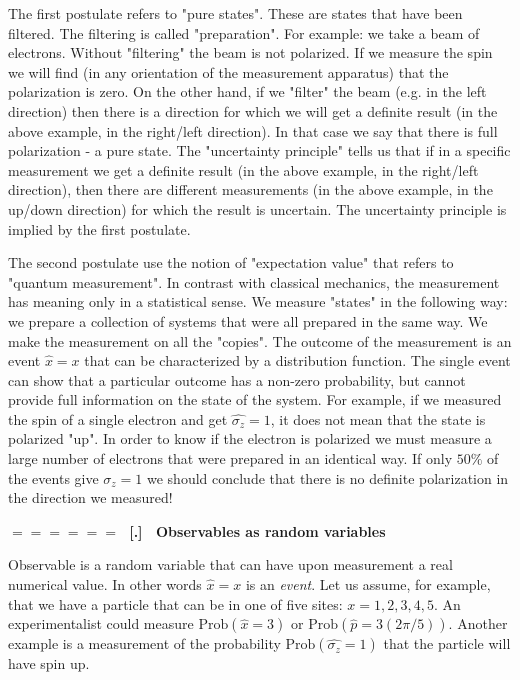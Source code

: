 \documentclass[onecolumn,fleqn]{revtex4}
\renewcommand{\thesubsection}{\arabic{subsection}}
\renewcommand{\thesubsubsection}{\arabic{subsubsection}}
\newcommand{\sheadC}[1]
{
\addtocounter{subsubsection}{1}
\vspace{5mm}
{\Large\bf $=\!=\!=\!=\!=\!=\;$ [\thesubsection.\thesubsubsection] \ #1}  
\nopagebreak
\phantomsection
}
\begin{document}
 
The first postulate refers to "pure states". These 
are states that have been filtered. 
The filtering is called "preparation". 
For example: we take a beam of electrons. 
Without "filtering" the beam is not polarized. 
If we measure the spin we will 
find (in any orientation of the measurement apparatus) 
that the polarization is zero. On the other hand, 
if we "filter" the beam (e.g. in the left direction) 
then there is a direction for which we will get 
a definite result (in the above example, in the right/left direction). 
In that case we say that there is full polarization - a pure state. 
The "uncertainty principle" tells us that if in a specific 
measurement we get a definite result 
(in the above example, in the right/left direction), 
then there are different measurements 
(in the above example, in the up/down direction) 
for which the result is uncertain. 
The uncertainty principle is implied by the first postulate.


The second postulate use the notion of "expectation value" 
that refers to "quantum measurement". In contrast with classical 
mechanics, the measurement has meaning only in a statistical sense.   
We measure "states" in the following way: 
we prepare a collection of systems that 
were all prepared in the same way. We make the measurement 
on all the "copies". The outcome of the measurement is an 
event ${\hat{x} = x}$ that can be characterized by a distribution 
function. The single event can show that a particular outcome 
has a non-zero probability, but cannot provide full information 
on the state of the system.
For example, if we measured the spin of a single electron and 
get ${\hat{\sigma_z} = 1}$, it does not mean that the state is polarized "up". 
In order to know if the electron is polarized we must measure 
a large number of electrons that were prepared in an identical way. 
If only $50\%$ of the events give ${\hat{\sigma_z} = 1}$ we should  
conclude that there is no definite polarization in the direction we measured!

 
\sheadC{Observables as random variables} 

Observable is a random variable that can have upon measurement 
a real numerical value. In other words ${\hat{x} = {x}}$
is an {\em event}. Let us assume, for example, that 
we have a particle that can be in one of five 
sites: ${x = 1 , 2 , 3 , 4 , 5}$. An experimentalist 
could measure ${\mbox{Prob}( \hat{x} = 3 )}$ 
or ${\mbox{Prob}( \hat{p} = 3(2\pi/5) )}$. 
Another example is a measurement of the 
probability ${\mbox{Prob}( \hat{\sigma_z} = 1)}$ 
that the particle will have spin up. 
\end{document}

